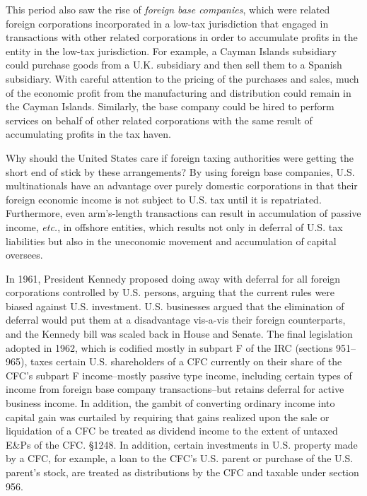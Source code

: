 This period also saw the rise of \emph{foreign base companies}, which were related foreign corporations incorporated in a low-tax jurisdiction that engaged in transactions with other related corporations in order to accumulate profits in the entity in the low-tax jurisdiction.  For example, a Cayman Islands subsidiary could purchase goods from a U.K. subsidiary and then sell them to a Spanish subsidiary.  With careful attention to the pricing of the purchases and sales, much of the economic profit from the manufacturing and distribution could remain in the Cayman Islands.  Similarly, the base company could be hired to perform services on behalf of other related corporations with the same result of accumulating profits in the tax haven.

Why should the United States care if foreign taxing authorities were getting the short end of stick by these arrangements?  By using foreign base companies, U.S. multinationals have an advantage over purely domestic corporations in that their foreign economic income is not subject to U.S. tax until it is repatriated.  Furthermore, even arm's-length transactions can result in accumulation of passive income, \emph{etc.}, in offshore entities, which results not only in deferral of U.S. tax liabilities but also in the uneconomic movement and accumulation of capital oversees.

In 1961, President Kennedy proposed doing away with deferral for all foreign corporations controlled by U.S. persons, arguing that the current rules were biased against U.S. investment.  U.S. businesses argued that the elimination of deferral would put them at a disadvantage vis-a-vis their foreign counterparts, and the Kennedy bill was scaled back in House and Senate.  The final legislation adopted in 1962, which is codified mostly in subpart F of the IRC (sections 951--965), taxes certain U.S. shareholders of a CFC currently on their share of the CFC's subpart F income--mostly passive type income, including certain types of income from foreign base company transactions--but retains deferral for active business income.  In addition, the gambit of converting ordinary income into capital gain was curtailed by requiring that gains realized upon the sale or liquidation of a CFC be treated as dividend income to the extent of untaxed E\&Ps of the CFC.  \S 1248.  In addition, certain investments in U.S. property made by a CFC, for example, a loan to the CFC's U.S. parent or purchase of the U.S. parent's stock, are treated as distributions by the CFC and taxable under section 956. 

